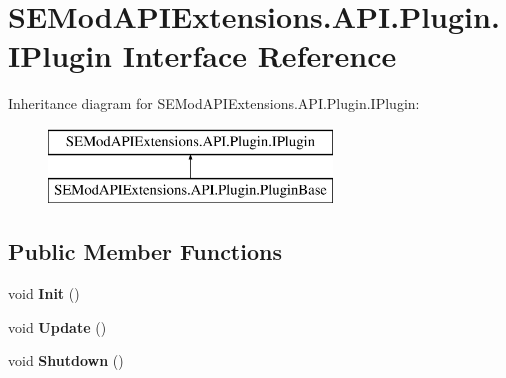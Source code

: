 \hypertarget{interface_s_e_mod_a_p_i_extensions_1_1_a_p_i_1_1_plugin_1_1_i_plugin}{}\section{S\+E\+Mod\+A\+P\+I\+Extensions.\+A\+P\+I.\+Plugin.\+I\+Plugin Interface Reference}
\label{interface_s_e_mod_a_p_i_extensions_1_1_a_p_i_1_1_plugin_1_1_i_plugin}
Inheritance diagram for S\+E\+Mod\+A\+P\+I\+Extensions.\+A\+P\+I.\+Plugin.\+I\+Plugin\+:\begin{figure}[H]
\begin{center}
\leavevmode
\includegraphics[height=2.000000cm]{interface_s_e_mod_a_p_i_extensions_1_1_a_p_i_1_1_plugin_1_1_i_plugin}
\end{center}
\end{figure}
\subsection*{Public Member Functions}
\begin{DoxyCompactItemize}
\item 
\hypertarget{interface_s_e_mod_a_p_i_extensions_1_1_a_p_i_1_1_plugin_1_1_i_plugin_ad4fe98ab401b71bbe5b64404afe7fef6}{}void {\bfseries Init} ()\label{interface_s_e_mod_a_p_i_extensions_1_1_a_p_i_1_1_plugin_1_1_i_plugin_ad4fe98ab401b71bbe5b64404afe7fef6}

\item 
\hypertarget{interface_s_e_mod_a_p_i_extensions_1_1_a_p_i_1_1_plugin_1_1_i_plugin_ae099f592aeef1ded6384706a255e9c0b}{}void {\bfseries Update} ()\label{interface_s_e_mod_a_p_i_extensions_1_1_a_p_i_1_1_plugin_1_1_i_plugin_ae099f592aeef1ded6384706a255e9c0b}

\item 
\hypertarget{interface_s_e_mod_a_p_i_extensions_1_1_a_p_i_1_1_plugin_1_1_i_plugin_a4d08fdb17f34f2770efedb8c4af8e3db}{}void {\bfseries Shutdown} ()\label{interface_s_e_mod_a_p_i_extensions_1_1_a_p_i_1_1_plugin_1_1_i_plugin_a4d08fdb17f34f2770efedb8c4af8e3db}

\end{DoxyCompactItemize}
